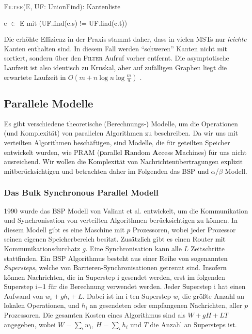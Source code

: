 \begin{algorithm} 
\caption{\textsc{Filter}(E, UF: UnionFind): Kantenliste}
\begin{algorithmic}[1]
\label{FilterStep-Algo}

\RETURN e $\in$ E mit (UF.find(e.s) != UF.find(e.t))

\end{algorithmic}
\end{algorithm}


Die erhöhte Effizienz in der Praxis stammt daher, dass in vielen MSTs nur \emph{leichte} Kanten enthalten sind. In diesem Fall werden \enquote{schweren} Kanten nicht mit sortiert, sondern über den \textsc{Filter} Aufruf vorher entfernt. Die asymptotische Laufzeit ist also identisch zu Kruskal, aber auf zufälligen Graphen liegt die erwartete Laufzeit in 
$O(m + n\log n \log \frac{m}{n})$ \cite{osipov2009filter}.





\subsection{Parallele Modelle}
Es gibt verschiedene theoretische (Berechnungs-) Modelle, um die Operationen (und Komplexität) von parallelen Algorithmen zu beschreiben. Da wir uns  mit verteilten Algorithmen beschäftigen, sind Modelle, die für geteilten Speicher entwickelt wurden, wie PRAM (\textbf{p}arallel \textbf{R}andom \textbf{A}ccess \textbf{M}achines) für uns nicht ausreichend. Wir wollen die Komplexität von
Nachrichtenübertragungen explizit mitberücksichtigen und betrachten daher im Folgenden das BSP und $\alpha$/$\beta$ Modell.


\subsubsection{Das Bulk Synchronous Parallel Modell}
1990 wurde das BSP Modell von Valiant et al. \cite{valiant1990bridging} entwickelt, um die Kommunikation und Synchronisation von verteilten Algorithmen berücksichtigen zu können. 
In diesem Modell gibt es eine Maschine mit $p$ Prozessoren, wobei jeder Prozessor seinen eigenen Speicherbereich besitzt. Zusätzlich gibt es einen Router mit Kommunikationsdurchatz $g$. Eine Synchronisation kann alle $L$ Zeitschritte stattfinden. Ein BSP Algorithmus besteht aus einer Reihe von sogenannten \textit{Supersteps}, welche von Barrieren-Synchronisationen getrennt sind. Insofern können Nachrichten, die in Superstep i gesendet werden, erst im folgenden Superstep i+1 für die Berechnung verwendet werden.
Jeder Superstep i hat einen Aufwand von $w_i+gh_i+L$. Dabei ist im i-ten Superstep $w_i$ die größte Anzahl an lokalen Operationen, und $h_i$ an gesendeten oder empfangenen Nachrichten, aller $p$ Prozessoren.
Die gesamten Kosten eines Algorithmus sind als $W+gH+LT$ angegeben, wobei $W=\sum_i w_i$, $H=\sum_i h_i$ und $T$ die Anzahl an Supersteps ist.


